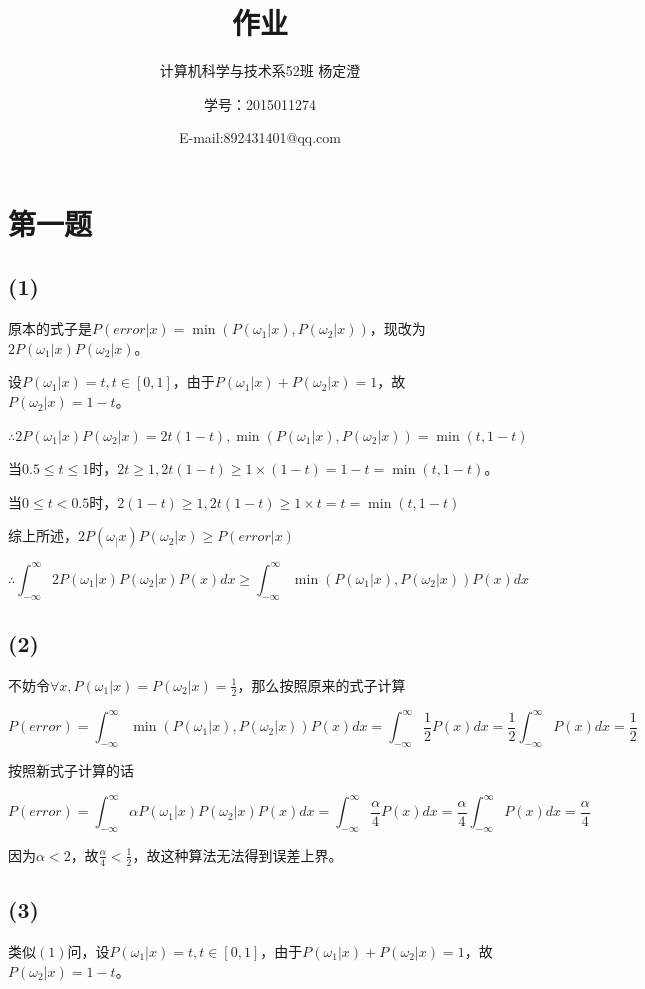 \documentclass{ctexart}
\begin{document}
\title{作业}
\author{计算机科学与技术系52班 杨定澄 \and 学号：2015011274 \and E-mail:892431401@qq.com}
\date{}
\maketitle
\section*{第一题}
\subsection*{(1)}
原本的式子是$P(error|x)=\min(P(\omega_1|x),P(\omega_2|x))$，现改为$2P(\omega_1|x)P(\omega_2|x)$。

设$P(\omega_1|x)=t,t \in [0,1]$，由于$P(\omega_1|x)+P(\omega_2|x)=1$，故$P(\omega_2|x)=1-t$。

$\therefore 2P(\omega_1|x)P(\omega_2|x)=2t(1-t),\min(P(\omega_1|x),P(\omega_2|x))=\min(t,1-t)$

当$0.5 \le t \le 1$时，$2t \ge 1,2t(1-t) \ge 1 \times (1-t)=1-t=\min(t,1-t)$。

当$0 \le t <0.5$时，$2(1-t) \ge 1,2t(1-t) \ge 1 \times t=t=\min(t,1-t)$

综上所述，$2P(\omega_|x)P(\omega_2|x) \ge P(error|x)$

\[\therefore \int_{-\infty}^{\infty}2P(\omega_1|x)P(\omega_2|x)P(x)dx \ge \int_{-\infty}^{\infty}\min(P(\omega_1|x),P(\omega_2|x))P(x)dx\]

\subsection*{(2)}
不妨令$\forall x,P(\omega_1|x)=P(\omega_2|x)=\frac{1}{2}$，那么按照原来的式子计算

\[P(error)=\int_{-\infty}^{\infty}\min(P(\omega_1|x),P(\omega_2|x))P(x)dx=\int_{-\infty}^{\infty}\frac{1}{2}P(x)dx=\frac{1}{2}\int_{-\infty}^{\infty}P(x)dx=\frac{1}{2}\]

按照新式子计算的话

\[P(error)=\int_{-\infty}^{\infty}\alpha P(\omega_1|x)P(\omega_2|x)P(x)dx=\int_{-\infty}^{\infty}\frac{\alpha}{4}P(x)dx=\frac{\alpha}{4}\int_{-\infty}^{\infty}P(x)dx=\frac{\alpha}{4}\]

因为$\alpha<2$，故$\frac{\alpha}{4}<\frac{1}{2}$，故这种算法无法得到误差上界。
\subsection*{(3)}
类似$(1)$问，设$P(\omega_1|x)=t,t \in [0,1]$，由于$P(\omega_1|x)+P(\omega_2|x)=1$，故$P(\omega_2|x)=1-t$。
\end{document}
